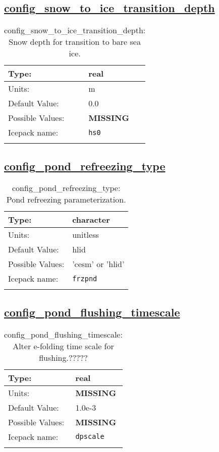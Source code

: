 \subsection[config\_snow\_to\_ice\_transition\_depth]{\hyperref[sec:nm_tab_meltponds]{config\_snow\_to\_ice\_transition\_depth}}
\label{subsec:nm_sec_config_snow_to_ice_transition_depth}
\begin{center}
\begin{longtable}{| p{2.0in} || p{4.0in} |}
    \hline
    Type: & real \\
    \hline
    Units: & \si{m} \\
    \hline
    Default Value: & 0.0 \\
    \hline
    Possible Values: & {\bf \color{red} MISSING} \\
    \hline
    \hline
    Icepack name: & \verb+hs0+ \\
    \caption{config\_snow\_to\_ice\_transition\_depth: Snow depth for transition to bare sea ice.}
\end{longtable}
\end{center}
\subsection[config\_pond\_refreezing\_type]{\hyperref[sec:nm_tab_meltponds]{config\_pond\_refreezing\_type}}
\label{subsec:nm_sec_config_pond_refreezing_type}
\begin{center}
\begin{longtable}{| p{2.0in} || p{4.0in} |}
    \hline
    Type: & character \\
    \hline
    Units: & \si{unitless} \\
    \hline
    Default Value: & hlid \\
    \hline
    Possible Values: & 'cesm' or 'hlid' \\
    \hline
    \hline
    Icepack name: & \verb+frzpnd+ \\
    \caption{config\_pond\_refreezing\_type: Pond refreezing parameterization.}
\end{longtable}
\end{center}
\subsection[config\_pond\_flushing\_timescale]{\hyperref[sec:nm_tab_meltponds]{config\_pond\_flushing\_timescale}}
\label{subsec:nm_sec_config_pond_flushing_timescale}
\begin{center}
\begin{longtable}{| p{2.0in} || p{4.0in} |}
    \hline
    Type: & real \\
    \hline
    Units: & {\bf \color{red} MISSING} \\
    \hline
    Default Value: & 1.0e-3 \\
    \hline
    Possible Values: & {\bf \color{red} MISSING} \\
    \hline
    \hline
    Icepack name: & \verb+dpscale+ \\
    \caption{config\_pond\_flushing\_timescale: Alter e-folding time scale for flushing.?????}
\end{longtable}
\end{center}
